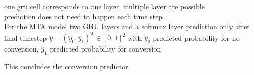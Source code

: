 \color{red}
    one gru cell corresponds to one layer, multiple layer are possible \\
    prediction does not need to happen each time step.\\
    For the MTA model two GRU layers and a softmax layer prediction only after final timestep $\hat{y}=(\hat{y}_0, \hat{y}_1)^T\in [0,1]^2$ with $\hat{y}_0$ predicted probability for no conversion, $\hat{y}_1$ predicted probability for conversion 
\color{black}

This concludes the conversion predictor
